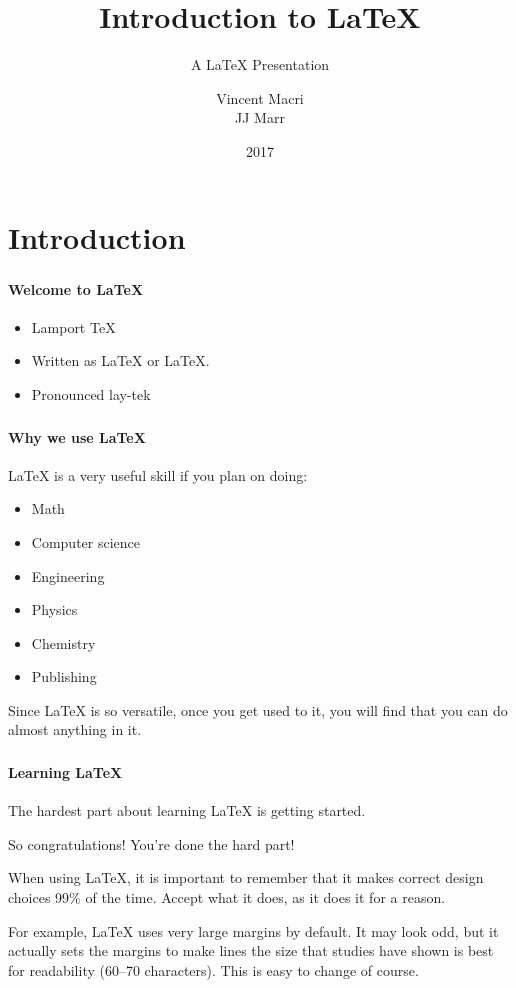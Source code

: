 \documentclass{beamer}
\title{Introduction to \LaTeX{}}
\subtitle{A \LaTeX{} Presentation}
\author{Vincent Macri\\JJ Marr}
\date{2017}
\begin{document}
	\frame{\titlepage}
	\section{Introduction}
	\begin{frame}
		\frametitle{\secname}
		\framesubtitle{Welcome to \LaTeX{}}
		\begin{itemize}[<+->]
			\item Lamport \TeX{}
			\item Written as \LaTeX{} or LaTeX.
			\item Pronounced lay-tek
		\end{itemize}
	\end{frame}
	\begin{frame}
		\frametitle{\secname}
		\framesubtitle{Why we use \LaTeX{}}
		\LaTeX{} is a very useful skill if you plan on doing:
		\pause
		\begin{itemize}
			\item Math
			\item Computer science
			\item Engineering
			\item Physics
			\item Chemistry
			\item Publishing
		\end{itemize}
		\pause
		Since \LaTeX{} is so versatile, once you get used to it, you will find that you can do almost anything in it.
	\end{frame}
	\begin{frame}
		\frametitle{\secname}
		\framesubtitle{Learning \LaTeX{}}
		The hardest part about learning \LaTeX{} is getting started.
		\pause

		So congratulations! You're done the hard part!
		\pause

		When using \LaTeX{}, it is important to remember that it makes correct design choices 99\% of the time. Accept what it does, as it does it for a reason.
		\pause

		For example, \LaTeX{} uses very large margins by default. It may look odd, but it actually sets the margins to make lines the size that studies have shown is best for readability (60--70 characters). This is easy to change of course.
	\end{frame}
\end{document}
